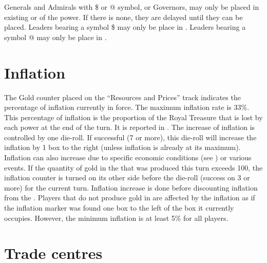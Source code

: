 Generals and Admirals with \$ or @ symbol, or Governors, may only be placed in
existing \COL or \TP of the power. If there is none, they are delayed until
they can be placed.
\bparag Leaders bearing a symbol \$ may only be place in .
\bparag Leaders bearing a symbol @ may only be place in .



\section{Inflation}\label{chInter:Inflation}

\aparag The Gold counter placed on the ``Resources and Prices'' track
indicates the percentage of inflation currently in force. The maximum
inflation rate is 33\%.
\bparag This percentage of inflation is the proportion of the Royal Treasure
that is lost by each power at the end of the turn. It is reported in
.
 The increase of inflation is controlled by one
die-roll. If successful (7 or more), this die-roll will increase the inflation
by 1 box to the right (unless inflation is already at its maximum).
\bparag Inflation can also increase due to specific economic conditions (see
) or various events.
\bparag \label{chInter:Inflation Gold ROTW} If the quantity of gold in the
\ROTW that was produced this turn exceeds 100\ducats, the inflation counter is
turned on its other side before the die-roll (success on 3 or more) for the
current turn.
\bparag Inflation increase is done before discounting inflation from the \RT.
 \label{chInter:InflationGold} Players that do not
produce gold in  are affected by the inflation as if the
inflation marker was found one box to the left of the box it currently
occupies.
\bparag However, the minimum inflation is at least 5\% for all players.



\section{Trade centres}\label{chInter:Trade Centres}

